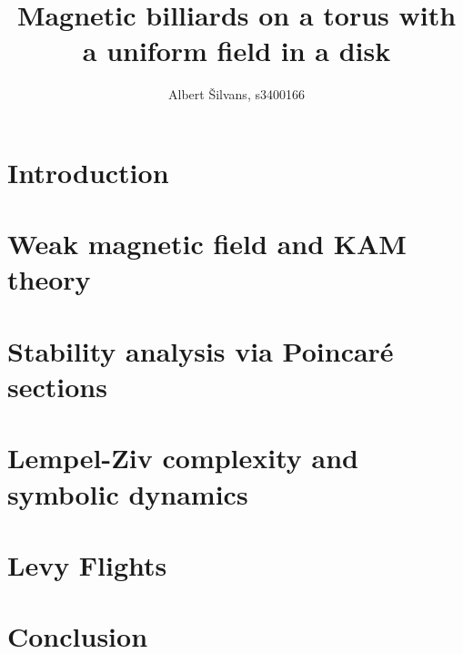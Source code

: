 \documentclass[notitlepage,twoside,a4paper,12pt]{article}
\title{Magnetic billiards on a torus with a uniform field in a disk}
\author{Albert \v{S}ilvans, s3400166}
\theoremstyle{definition}
\begin{document}
\maketitle
\newpage
\tableofcontents
\listoffigures
\listoftables
\newpage

\section{Introduction}







\section{Weak magnetic field and KAM theory}






\section{Stability analysis via Poincar\'e sections}



\section{Lempel-Ziv complexity and symbolic dynamics}



\section{Levy Flights}


\section{Conclusion}



\newpage


\end{document}
